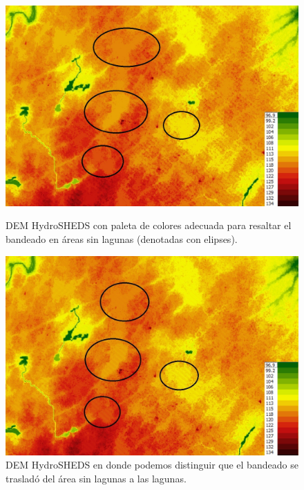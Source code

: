 \documentclass[10pt,a4paper, twoside]{report}
\begin{document}
\begin{figure}[!htb]
   \begin{minipage}{0.48\textwidth}
			\centering
			\includegraphics[width=1.0\linewidth]{imagenes/HydroSHEDSBandeadoZoom.jpg}
			\caption{DEM HydroSHEDS con paleta de colores adecuada para resaltar el bandeado en áreas sin lagunas (denotadas con elipses).}
			\label{HydroSHEDSBandeadoZoom}
   \end{minipage}\hfill
   \begin {minipage}{0.48\textwidth}
			\centering
			\includegraphics[width=1.0\linewidth]{imagenes/HydroSHEDSBandeadoZoomFourier.jpg}
			\caption{DEM HydroSHEDS en donde podemos distinguir que el bandeado se trasladó del área sin lagunas a las lagunas.}
			\label{HydroSHEDSBandeadoZoomFourier}
   \end{minipage}
\end{figure}
\end{document}
